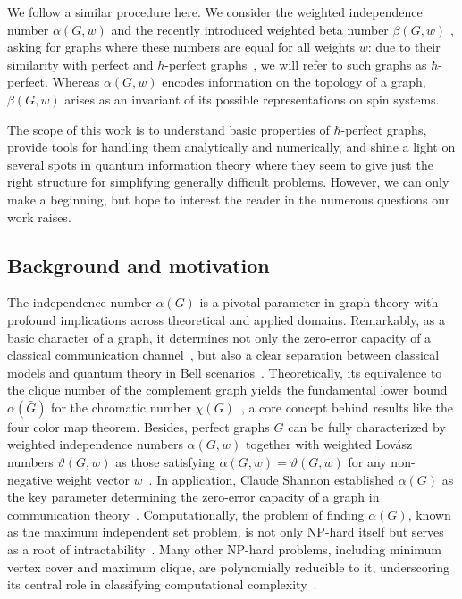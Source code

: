 \documentclass[
12pt,
prx,
aps,
reprint,
a4paper,
longbibliograph,
nofootinbib,
nobibnotes,
superscriptaddress
]{revtex4-2}
\theoremstyle{definition}
\begin{document}
We follow a similar procedure here. We consider the weighted independence number $\alpha(G,w)$ and the recently introduced weighted beta number $\beta(G,w)$ \cite{xu2023bounding}, asking for graphs where these numbers are equal for all weights $w$: due to their similarity with perfect and $h$-perfect graphs~\cite{fonlupt1982transformations}, we will refer to such graphs as $\hbar$-perfect. 
Whereas $\alpha(G,w)$ encodes information on the topology of a graph, $\beta(G,w)$ arises as an invariant of its possible representations on spin systems.

The scope of this work is to understand basic properties of $\hbar$-perfect graphs, provide tools for handling them analytically and numerically, and shine a light on several spots in quantum information theory where they seem to give just the right structure for simplifying generally difficult problems. However, we can only make a beginning, but hope to interest the reader in the numerous questions our work raises. 


\subsection{Background and motivation}
{The independence number $\alpha(G)$ is a pivotal parameter in graph theory with profound implications across theoretical and applied domains. {Remarkably, as a basic character of a graph, it determines not only the zero-error capacity of a classical communication channel~\cite{Shannon1956TheZE,Alon2006TheSC}, but also a clear separation between classical models and quantum theory in Bell scenarios~\cite{cabello2014graph}.}
Theoretically, its equivalence to the clique number of the complement graph yields the fundamental lower bound $\alpha(\bar{G})$ for the chromatic number $\chi(G)$~\cite{Diestel2025GraphT}, a core concept behind results like the four color map theorem. 
Besides, perfect graphs $G$ can be fully characterized by weighted independence numbers $\alpha(G,w)$ together with weighted Lov\'asz numbers $\vartheta(G,w)$ as those satisfying $\alpha(G,w)=\vartheta(G,w)$ for any non-negative weight vector $w$~\cite{lovasz2019Graphs}.
In application, Claude Shannon established $\alpha(G)$ as the key parameter determining the zero-error capacity of a graph in communication theory~\cite{Shannon1956TheZE}. Computationally, the problem of finding $\alpha(G)$, known as the maximum independent set problem, is not only NP-hard itself but serves as a root of intractability~\cite{Karp1972ReducibilityAC}. Many other NP-hard problems, including minimum vertex cover and maximum clique, are polynomially reducible to it, underscoring its central role in classifying computational complexity~\cite{Cormen2001IntroductionTA}.} 
\end{document}

